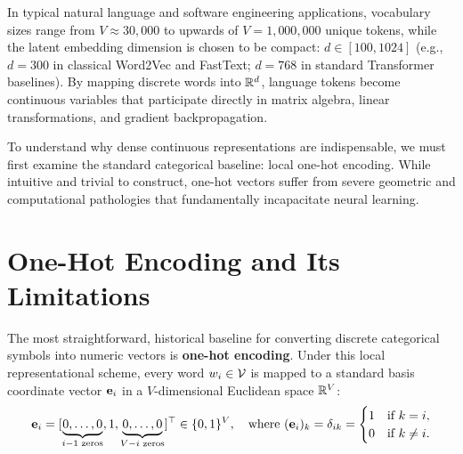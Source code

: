 \documentclass[../../../main.tex]{subfiles}
\begin{document}
In typical natural language and software engineering applications, vocabulary sizes range from $V \approx 30{,}000$ to upwards of $V = 1{,}000{,}000$ unique tokens, while the latent embedding dimension is chosen to be compact: $d \in [100, 1024]$ (e.g., $d = 300$ in classical Word2Vec and FastText; $d = 768$ in standard Transformer baselines). By mapping discrete words into $\mathbb{R}^d$, language tokens become continuous variables that participate directly in matrix algebra, linear transformations, and gradient backpropagation.

To understand why dense continuous representations are indispensable, we must first examine the standard categorical baseline: local one-hot encoding. While intuitive and trivial to construct, one-hot vectors suffer from severe geometric and computational pathologies that fundamentally incapacitate neural learning.

\clearpage

\clearpage
\section{One-Hot Encoding and Its Limitations}
\label{sec:onehot_baseline}

The most straightforward, historical baseline for converting discrete categorical symbols into numeric vectors is \textbf{one-hot encoding}. Under this local representational scheme, every word $w_i \in \mathcal{V}$ is mapped to a standard basis coordinate vector $\mathbf{e}_i$ in a $V$-dimensional Euclidean space $\mathbb{R}^V$:
\begin{equation}
\label{eq:onehot_def}
\mathbf{e}_i = [\underbrace{0, \dots, 0}_{i-1\text{ zeros}}, 1, \underbrace{0, \dots, 0}_{V-i\text{ zeros}}]^\top \in \{0, 1\}^V, \quad \text{where } (\mathbf{e}_i)_k = \delta_{ik} = \begin{cases} 1 & \text{if } k = i, \\ 0 & \text{if } k \neq i. \end{cases}
\end{equation}
\end{document}
